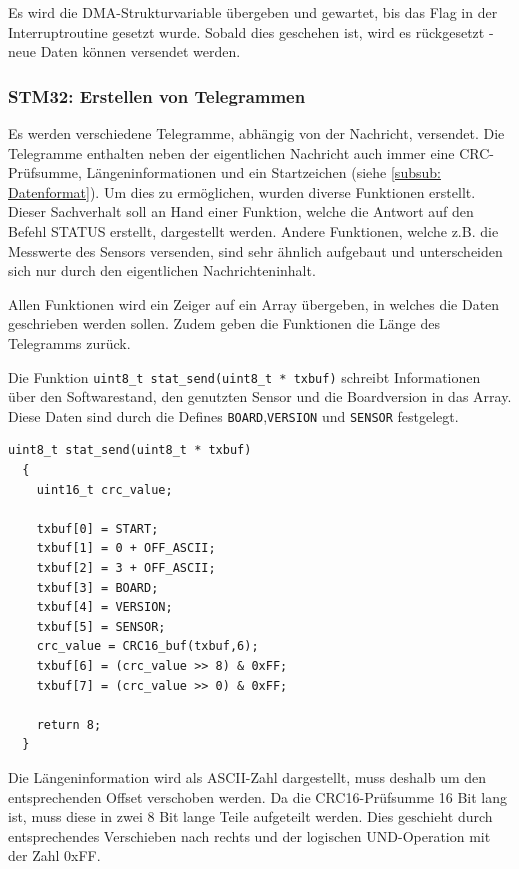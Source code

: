 Es wird die DMA-Strukturvariable übergeben und gewartet, bis das Flag in der Interruptroutine gesetzt wurde. Sobald dies geschehen ist, wird es rückgesetzt - neue
Daten können versendet werden.

\subsubsection{STM32: Erstellen von Telegrammen}

Es werden verschiedene Telegramme, abhängig von der Nachricht, versendet. Die Telegramme enthalten neben der eigentlichen Nachricht auch immer eine CRC-Prüfsumme,
Längeninformationen und ein Startzeichen (siehe \ref{subsub: Datenformat}). Um dies zu ermöglichen, wurden diverse Funktionen erstellt. Dieser Sachverhalt soll
an Hand einer Funktion, welche die Antwort auf den Befehl STATUS erstellt, dargestellt werden. Andere Funktionen, welche z.B. die Messwerte des Sensors versenden,
sind sehr ähnlich aufgebaut und unterscheiden sich nur durch den eigentlichen Nachrichteninhalt.

\smallskip

Allen Funktionen wird ein Zeiger auf ein Array übergeben, in welches die Daten geschrieben werden sollen. Zudem geben die Funktionen die Länge des Telegramms zurück.

\smallskip

Die Funktion \lstinline!uint8_t stat_send(uint8_t * txbuf)! schreibt Informationen über den Softwarestand, den genutzten Sensor und die Boardversion in das Array. Diese
Daten sind durch die Defines \lstinline!BOARD!,\lstinline!VERSION! und \lstinline!SENSOR! festgelegt.

\begin{lstlisting}[caption={\textit{Status-Telegramm}}]
  uint8_t stat_send(uint8_t * txbuf)
  {
    uint16_t crc_value;
    
    txbuf[0] = START; 
    txbuf[1] = 0 + OFF_ASCII;
    txbuf[2] = 3 + OFF_ASCII;
    txbuf[3] = BOARD;
    txbuf[4] = VERSION;
    txbuf[5] = SENSOR;
    crc_value = CRC16_buf(txbuf,6);
    txbuf[6] = (crc_value >> 8) & 0xFF;				
    txbuf[7] = (crc_value >> 0) & 0xFF;
  
    return 8;										
  }
\end{lstlisting}

Die Längeninformation wird als \ac{ASCII}-Zahl dargestellt, muss deshalb um den entsprechenden Offset verschoben werden. Da die CRC16-Prüfsumme 16 Bit lang ist,
muss diese in zwei 8 Bit lange Teile aufgeteilt werden. Dies geschieht durch entsprechendes Verschieben nach rechts und der logischen UND-Operation mit der Zahl 
0xFF.

